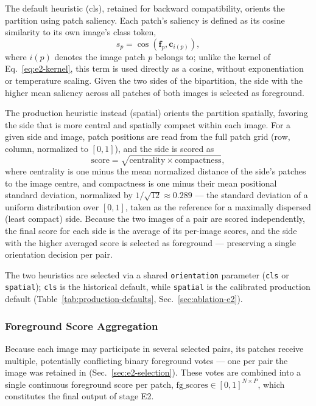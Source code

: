 The default heuristic (cls), retained for backward compatibility, orients the partition using patch saliency. Each patch's saliency is defined as its cosine similarity to its own image's class token,
\begin{equation}
    s_p = \cos(\mathbf{f}_p, \mathbf{c}_{i(p)}),
    \label{eq:cls-saliency}
\end{equation}
where $i(p)$ denotes the image patch $p$ belongs to; unlike the kernel of Eq.~\ref{eq:e2-kernel}, this term is used directly as a cosine, without exponentiation or temperature scaling. Given the two sides of the bipartition, the side with the higher mean saliency across all patches of both images is selected as foreground.

The production heuristic instead (spatial) orients the partition spatially, favoring the side that is more central and spatially compact within each image. For a given side and image, patch positions are read from the full patch grid (row, column, normalized to $[0,1]$), and the side is scored as
\begin{equation}
    \mathrm{score} = \sqrt{\mathrm{centrality} \times \mathrm{compactness}},
    \label{eq:spatial-score}
\end{equation}
where centrality is one minus the mean normalized distance of the side's patches to the image centre, and compactness is one minus their mean positional standard deviation, normalized by $1/\sqrt{12} \approx 0.289$ — the standard deviation of a uniform distribution over $[0,1]$, taken as the reference for a maximally dispersed (least compact) side. Because the two images of a pair are scored independently, the final score for each side is the average of its per-image scores, and the side with the higher averaged score is selected as foreground — preserving a single orientation decision per pair.

The two heuristics are selected via a shared \texttt{orientation} parameter (\texttt{cls} or \texttt{spatial}); \texttt{cls} is the historical default, while \texttt{spatial} is the calibrated production default (Table~\ref{tab:production-defaults}, Sec.~\ref{sec:ablation-e2}).

\subsubsection{Foreground Score Aggregation}
\label{sec:e2-voting}

Because each image may participate in several selected pairs, its patches
receive multiple, potentially conflicting binary foreground votes — one per pair the image was retained in (Sec.~\ref{sec:e2-selection}). These votes are combined into a single continuous foreground score per patch,
$\mathrm{fg\_scores} \in [0,1]^{N \times P}$, which constitutes the final
output of stage E2.


